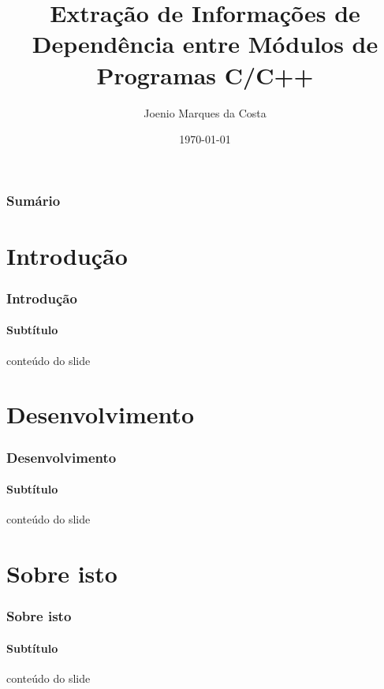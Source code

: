 \documentclass{beamer}
\title[Extração automática de grafos de colaboração]{Extração de Informações de Dependência entre Módulos de Programas C/C++}
\author[Joenio Costa]{Joenio Marques da Costa}
\institute{Universidade Católica do Salvador}
\date{\today}
\begin{document}
\frame{\titlepage} %

\begin{frame}
 \frametitle{Sumário}
 \tableofcontents
\end{frame}

\section{Introdução}
\begin{frame}
\frametitle{Introdução}
\framesubtitle{Subtítulo}
 conteúdo do slide
\end{frame}

\section{Desenvolvimento}
\begin{frame}
\frametitle{Desenvolvimento}
\framesubtitle{Subtítulo}
 conteúdo do slide
\end{frame}

\section{Sobre isto}
\begin{frame}
\frametitle{Sobre isto}
\framesubtitle{Subtítulo}
 conteúdo do slide
\end{frame}
\end{document}
